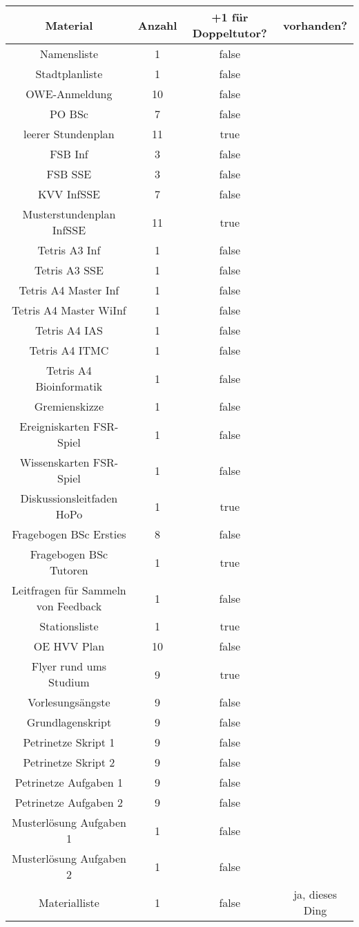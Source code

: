 \documentclass[10pt,a4paper,oneside,ngerman,numbers=noenddot]{scrartcl}
\begin{document}
	\begin{tabular}{c|c|c|c}
		\textbf{Material} & \textbf{Anzahl} & \textbf{+1 für Doppeltutor?} & \textbf{vorhanden?} \\
		\hline
		Namensliste & 1 & false & \\
		\hline
		Stadtplanliste & 1 & false & \\
		\hline
		OWE-Anmeldung & 10 & false & \\
		\hline
		PO BSc & 7 & false & \\
		\hline
		leerer Stundenplan & 11 & true & \\
		\hline
		FSB Inf & 3 & false & \\
		\hline
		FSB SSE & 3 & false & \\
		\hline
		KVV InfSSE & 7 & false & \\
		\hline
		Musterstundenplan InfSSE & 11 & true & \\
		\hline
		Tetris A3 Inf & 1 & false & \\
		\hline
		Tetris A3 SSE & 1 & false & \\
		\hline
		Tetris A4 Master Inf & 1 & false & \\
		\hline
		Tetris A4 Master WiInf & 1 & false & \\
		\hline
		Tetris A4 IAS & 1 & false & \\
		\hline
		Tetris A4 ITMC & 1 & false & \\
		\hline
		Tetris A4 Bioinformatik & 1 & false & \\
		\hline
		Gremienskizze & 1 & false & \\
		\hline
		Ereigniskarten FSR-Spiel & 1 & false & \\
		\hline
		Wissenskarten FSR-Spiel & 1 & false & \\
		\hline
		Diskussionsleitfaden HoPo & 1 & true & \\
		\hline
		Fragebogen BSc Ersties & 8 & false & \\
		\hline
		Fragebogen BSc Tutoren & 1 & true & \\
		\hline
		Leitfragen für Sammeln von Feedback & 1 & false & \\
		\hline
		Stationsliste & 1 & true & \\
		\hline
		OE HVV Plan & 10 & false & \\
		\hline
		Flyer rund ums Studium & 9 & true & \\
		\hline
		Vorlesungsängste & 9 & false & \\
		\hline
		Grundlagenskript & 9 & false & \\
		\hline
		Petrinetze Skript 1 & 9 & false & \\
		\hline
		Petrinetze Skript 2 & 9 & false & \\
		\hline
		Petrinetze Aufgaben 1 & 9 & false & \\
		\hline
		Petrinetze Aufgaben 2 & 9 & false & \\
		\hline
		Musterlösung Aufgaben 1 & 1 & false & \\
		\hline
		Musterlösung Aufgaben 2 & 1 & false & \\
		\hline
		Materialliste & 1 & false & ja, dieses Ding \\
	\end{tabular}
\end{document}

